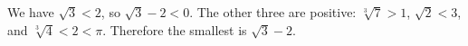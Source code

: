 We have $\sqrt3<2$, so $\sqrt3-2<0$. The other three are positive: $\sqrt[3]7>1$, $\sqrt2<3$, and $\sqrt[3]4<2<\pi$. Therefore the smallest is $\boxed{\sqrt3-2}$.
